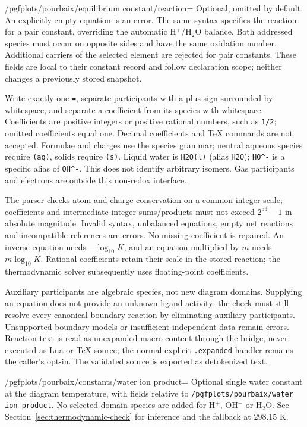 \documentclass[a4paper,11pt]{ltxdoc}
\begin{document}
\begin{key}{/pgfplots/pourbaix/equilibrium constant/reaction=}
Optional; omitted by default. An explicitly empty equation is an error.
The same syntax specifies the reaction for a pair
constant, overriding the automatic H$^+$/H$_2$O balance. Both addressed species
must occur on opposite sides and have the same oxidation number. Additional
carriers of the selected element are rejected for pair constants.
These fields are local to their constant record and follow declaration scope;
neither changes a previously stored snapshot.

Write exactly one \texttt{=}, separate participants with a plus sign surrounded
by whitespace, and separate a coefficient from its species with whitespace.
Coefficients are positive integers or positive rational numbers, such as
\texttt{1/2}; omitted coefficients equal one. Decimal coefficients and TeX
commands are not accepted. Formulae and charges use the species grammar;
neutral aqueous species require \texttt{(aq)}, solids require \texttt{(s)}.
Liquid water is \texttt{H2O(l)} (alias \texttt{H2O}); \verb|HO^-| is a
specific alias of \verb|OH^-|. This does not identify arbitrary isomers.
Gas participants and electrons are outside this non-redox interface.

The parser checks atom and charge conservation on a common integer scale;
coefficients and intermediate integer sums/products must not exceed $2^{53}-1$
in absolute magnitude. Invalid syntax, unbalanced equations, empty net reactions
and incompatible references are errors. No missing coefficient is repaired.
An inverse equation needs $-\log_{10}K$, and an equation multiplied by $m$ needs
$m\log_{10}K$. Rational coefficients retain their scale in the stored reaction;
the thermodynamic solver subsequently uses floating-point coefficients.

Auxiliary participants are algebraic species, not new diagram domains. Supplying
an equation does not provide an unknown ligand activity: the check must still
resolve every canonical boundary reaction by eliminating auxiliary participants.
Unsupported boundary models or insufficient independent data remain errors.
Reaction text is read as unexpanded macro content through the bridge, never
executed as Lua or TeX source; the normal explicit \texttt{.expanded} handler
remains the caller's opt-in. The validated source is exported as detokenized text.
\end{key}
\begin{key}{/pgfplots/pourbaix/constants/water ion product=}
Optional single water constant at the diagram temperature, with fields relative
to \texttt{/pgfplots/pourbaix/water ion product}. No selected-domain species are
added for H$^+$, OH$^-$ or H$_2$O. See Section~\ref{sec:thermodynamic-check}
for inference and the fallback at 298.15 K.
\end{key}
\end{document}
